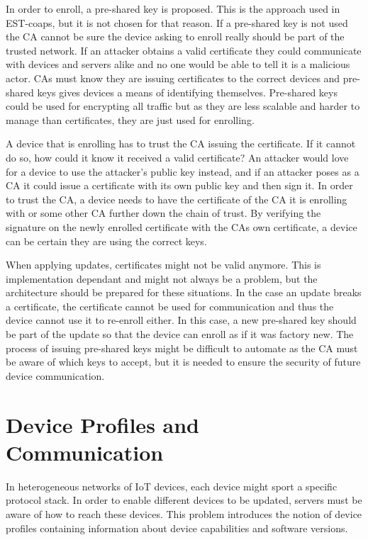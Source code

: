\documentclass[0-thesis.tex]{subfiles}
\begin{document}
In order to enroll, a pre-shared key is proposed. This is the approach used in EST-coaps,
but it is not chosen for that reason. If a pre-shared key is not used the CA cannot be
sure the device asking to enroll really should be part of the trusted network. If an
attacker obtains a valid certificate they could communicate with devices and servers alike
and no one would be able to tell it is a malicious actor. CAs must know they are issuing
certificates to the correct devices and pre-shared keys gives devices a means of
identifying themselves. Pre-shared keys could be used for encrypting all traffic but as
they are less scalable and harder to manage than certificates, they are just used for
enrolling.

A device that is enrolling has to trust the CA issuing the certificate. If it cannot do
so, how could it know it received a valid certificate? An attacker would love for a device
to use the attacker's public key instead, and if an attacker poses as a CA it could issue a
certificate with its own public key and then sign it. In order to trust the CA, a device
needs to have the certificate of the CA it is enrolling with or some other CA further down
the chain of trust. By verifying the signature on the newly enrolled certificate with the
CAs own certificate, a device can be certain they are using the correct keys.

When applying updates, certificates might not be valid anymore. This is implementation
dependant and might not always be a problem, but the architecture should be prepared for
these situations. In the case an update breaks a certificate, the certificate cannot be
used for communication and thus the device cannot use it to re-enroll either. In this
case, a new pre-shared key should be part of the update so that the device can enroll as
if it was factory new. The process of issuing pre-shared keys might be difficult to
automate as the CA must be aware of which keys to accept, but it is needed to ensure the
security of future device communication.

\section{Device Profiles and Communication}
\label{sec:communication}
In heterogeneous networks of IoT devices, each device might sport a specific protocol
stack. In order to enable different devices to be updated, servers must be aware of how to
reach these devices. This problem introduces the notion of device profiles containing
information about device capabilities and software versions. 
\end{document}
